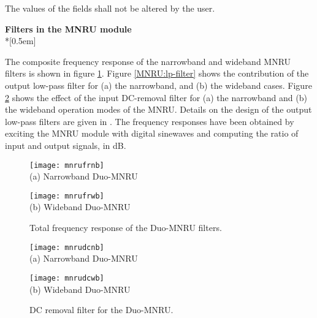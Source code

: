 The values of the fields shall not be altered by the user.


{\Large\bf Filters in the MNRU module  }\\*[0.5em]

The composite frequency response of the narrowband and wideband MNRU
filters is shown in figure \ref{MNRU:both-filters}. Figure
\ref{MNRU:lp-filter} shows the contribution of the output low-pass
filter for (a) the narrowband, and (b) the wideband cases. Figure
\ref{MNRU:hp-filter} shows the effect of the input DC-removal filter
for (a) the narrowband and (b) the wideband operation modes of the
MNRU. Details on the design of the output low-pass filters are given
in \cite{Duo-MNRU}. The frequency responses have been obtained by
exciting the MNRU module with digital sinewaves and computing the
ratio of input and output signals, in dB.


\begin{figure}[p]
  \begin{center}
    \texttt{[image: mnrufrnb]}
    \\
    (a) Narrowband Duo-MNRU

    \texttt{[image: mnrufrwb]}
    \\
    (b) Wideband Duo-MNRU
  \end{center}
  \caption{ Total frequency response of the Duo-MNRU filters.
            \label{MNRU:both-filters}
          }
\end{figure}

\begin{figure}[p]
  \begin{center}
    \texttt{[image: mnrudcnb]}
    \\
    (a) Narrowband Duo-MNRU

    \texttt{[image: mnrudcwb]}
    \\
    (b) Wideband Duo-MNRU
  \end{center}
  \caption{ DC removal filter for the Duo-MNRU. \label{MNRU:hp-filter} }
\end{figure}

